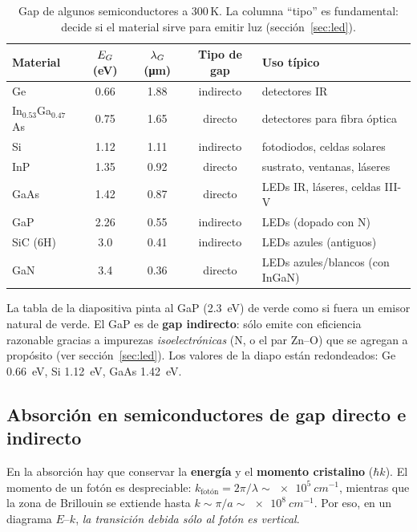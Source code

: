 \begin{table}[H]
\centering\small
\caption{Gap de algunos semiconductores a 300\,K. La columna ``tipo'' es fundamental: decide si
el material sirve para emitir luz (sección~\ref{sec:led}).}
\label{tab:gaps}
\begin{tabular}{lcccl}
\toprule
Material & $E_G$ (\si{\eV}) & $\lambda_G$ (\si{\micro m}) & Tipo de gap & Uso típico \\
\midrule
Ge                       & 0.66 & 1.88 & indirecto & detectores IR \\
In$_{0.53}$Ga$_{0.47}$As & 0.75 & 1.65 & directo   & detectores para fibra óptica \\
Si                       & 1.12 & 1.11 & indirecto & fotodiodos, celdas solares \\
InP                      & 1.35 & 0.92 & directo   & sustrato, ventanas, láseres \\
GaAs                     & 1.42 & 0.87 & directo   & LEDs IR, láseres, celdas III-V \\
GaP                      & 2.26 & 0.55 & indirecto & LEDs (dopado con N) \\
SiC (6H)                 & 3.0  & 0.41 & indirecto & LEDs azules (antiguos) \\
GaN                      & 3.4  & 0.36 & directo   & LEDs azules/blancos (con InGaN) \\
\bottomrule
\end{tabular}
\end{table}

\begin{ojo}
La tabla de la diapositiva pinta al GaP (\SI{2.3}{\eV}) de verde como si fuera un emisor
natural de verde. El GaP es de \textbf{gap indirecto}: sólo emite con eficiencia razonable
gracias a impurezas \emph{isoelectrónicas} (N, o el par Zn--O) que se agregan a propósito
(ver sección~\ref{sec:led}). Los valores de la diapo están redondeados:
Ge \SI{0.66}{\eV}, Si \SI{1.12}{\eV}, GaAs \SI{1.42}{\eV}.
\end{ojo}

\subsection{Absorción en semiconductores de gap directo e indirecto}

En la absorción hay que conservar la \textbf{energía} y el \textbf{momento cristalino}
($\hbar k$). El momento de un fotón es despreciable: $k_{\text{fotón}}=2\pi/\lambda\sim
\SI{e5}{cm^{-1}}$, mientras que la zona de Brillouin se extiende hasta $k\sim\pi/a\sim
\SI{e8}{cm^{-1}}$. Por eso, en un diagrama $E$--$k$, \emph{la transición debida sólo al
fotón es vertical}.

